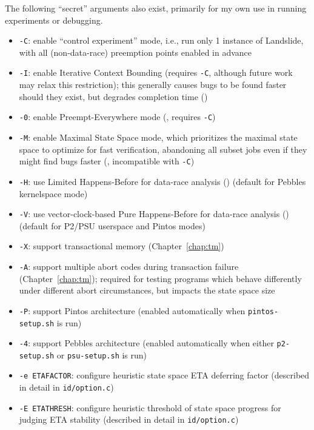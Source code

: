 The following ``secret'' arguments also exist, primarily for my own use in running experiments or debugging.

\begin{itemize}
	\item {\tt -C}: enable ``control experiment'' mode, i.e., run only 1 instance of Landslide, with all (non-data-race) preemption points enabled in advance
	\item {\tt -I}: enable Iterative Context Bounding (requires {\tt -C}, although future work may relax this restriction);
		this generally causes bugs to be found faster should they exist, but degrades completion time
		(\sect{\ref{sec:landslide-icb}})
	\item {\tt -0}: enable Preempt-Everywhere mode (\sect{\ref{sec:quicksand-eval}}, requires {\tt -C})
	\item {\tt -M}: enable Maximal State Space mode,
		which prioritizes the maximal state space to optimize for fast verification,
		abandoning all subset jobs even if they might find bugs faster
		(\sect{\ref{chap:tm}}, incompatible with {\tt -C})
	\item {\tt -H}: use Limited Happens-Before for data-race analysis (\sect{\ref{sec:background-hb}})
		(default for Pebbles kernelspace mode)
	\item {\tt -V}: use vector-clock-based Pure Happens-Before for data-race analysis (\sect{\ref{sec:background-hb}})
		(default for P2/PSU userspace and Pintos modes)
	\item {\tt -X}: support transactional memory (Chapter~\ref{chap:tm})
	\item {\tt -A}: support multiple abort codes during transaction failure (Chapter~\ref{chap:tm});
		required for testing programs which behave differently under different abort circumstances,
		but impacts the state space size
	\item {\tt -P}: support Pintos architecture (enabled automatically when {\tt pintos-setup.sh} is run)
	\item {\tt -4}: support Pebbles architecture (enabled automatically when either {\tt p2-setup.sh} or {\tt psu-setup.sh} is run)
	\item {\tt -e ETAFACTOR}: configure heuristic state space ETA deferring factor (described in detail in {\tt id/option.c})
	\item {\tt -E ETATHRESH}: configure heuristic threshold of state space progress for judging ETA stability (described in detail in {\tt id/option.c})
\end{itemize}

